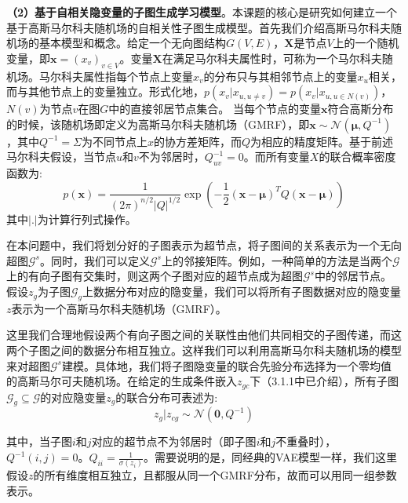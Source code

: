 \documentclass[12pt,UTF8,AutoFakeBold=2,a4paper]{ctexart} %
\begin{document}
\textbf{（2）基于自相关隐变量的子图生成学习模型}。本课题的核心是研究如何建立一个基于高斯马尔科夫随机场的自相关性子图生成模型。首先我们介绍高斯马尔科夫随机场的基本模型和概念。给定一个无向图结构$G(V, E)$，$\mathbf{X}$是节点$V$上的一个随机变量，即$\mathbf{x} = ({x}_v)_{v\in V}$。变量$\mathbf{X}$在满足马尔科夫属性时，可称为一个马尔科夫随机场。马尔科夫属性指每个节点上变量${x}_v$的分布只与其相邻节点上的变量${x}_u$相关，而与其他节点上的变量独立。形式化地，$p({x}_v|{x}_{u, u\ne v}) = p({x}_v|{x}_{u, u\in N(v)})$，$N(v)$为节点$v$在图$G$中的直接邻居节点集合。
当每个节点的变量$\mathbf{x}$符合高斯分布的时候，该随机场即定义为高斯马尔科夫随机场（GMRF），即$\mathbf{x}\sim\mathcal{N}(\boldsymbol{\mu}, {Q}^{-1})$，其中${Q}^{-1}=\Sigma$为不同节点上$x$的协方差矩阵，而${Q}$为相应的精度矩阵。基于前述马尔科夫假设，当节点$u$和$v$不为邻居时，${Q}^{-1}_{uv} = 0$。而所有变量$X$的联合概率密度函数为:
\begin{equation}
    p(\mathbf{x}) = \frac{1}{(2\pi)^{n/2} |Q|^{1/2}} \exp\left(-\frac{1}{2} (\mathbf{x} - \boldsymbol{\mu})^T Q (\mathbf{x} - \boldsymbol{\mu}) \right)
    \label{eq:7}
\end{equation}
其中$|.|$为计算行列式操作。

在本问题中，我们将划分好的子图表示为超节点，将子图间的关系表示为一个无向超图$\mathcal{G}^s$。同时，我们可以定义$\mathcal{G}^s$上的邻接矩阵。例如，一种简单的方法是当两个$\mathcal{G}$上的有向子图有交集时，则这两个子图对应的超节点成为超图$\mathcal{G}^s$中的邻居节点。假设$z_g$为子图$\mathcal{G}_g$上数据分布对应的隐变量，我们可以将所有子图数据对应的隐变量$z$表示为一个高斯马尔科夫随机场（GMRF）。

这里我们合理地假设两个有向子图之间的关联性由他们共同相交的子图传递，而这两个子图之间的数据分布相互独立。这样我们可以利用高斯马尔科夫随机场的模型来对超图$\mathcal{G}^s$建模。具体地，我们将子图隐变量的联合先验分布选择为一个零均值的高斯马尔可夫随机场。在给定的生成条件嵌入$z_{gc}$下（3.1.1中已介绍），所有子图$\mathcal{G}_g\subseteq\mathcal{G}$的对应隐变量$z_g$的联合分布可表述为:
\begin{equation}
{z_{g}}|{z_{cg}}\sim\mathcal{N}(\mathbf{0}, {Q}^{-1})
\end{equation}

其中，当子图$i$和$j$对应的超节点不为邻居时（即子图$i$和$j$不重叠时），${Q}^{-1}(i,j) = 0$。$Q_{ii} = \frac{1}{\sigma(z_i)}$。需要说明的是，同经典的VAE模型一样，我们这里假设$z$的所有维度相互独立，且都服从同一个GMRF分布，故而可以用同一组参数表示。
\end{document}
